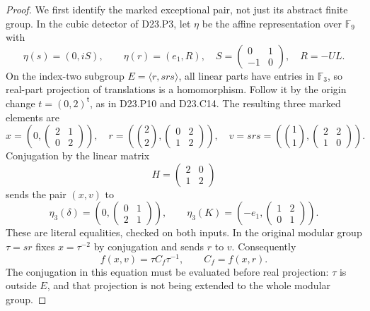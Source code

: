 \begin{proof}
We first identify the marked exceptional pair, not just its
abstract finite group.  In the cubic detector of D23.P3, let
$\eta$ be the affine representation over $\mathbb F_9$ with
\[
 \eta(s)=(0,iS),\qquad \eta(r)=(e_1,R),\quad
 S=\begin{pmatrix}0&1\\-1&0\end{pmatrix},\quad R=-UL.
\]
On the index-two subgroup $E=\langle r,srs\rangle$, all
linear parts have entries in $\mathbb F_3$, so real-part
projection of translations is a homomorphism.  Follow it
by the origin change $t=(0,2)^{\mathsf t}$, as in D23.P10
and D23.C14.  The resulting three marked elements are
\[
 x=\left(0,\begin{pmatrix}2&1\\0&2\end{pmatrix}\right),\quad
 r=\left(\binom22,\begin{pmatrix}0&2\\1&2\end{pmatrix}\right),\quad
 v=srs=\left(\binom11,\begin{pmatrix}2&2\\1&0\end{pmatrix}\right).
\]
Conjugation by the linear matrix
\[
                         H=\begin{pmatrix}2&0\\1&2\end{pmatrix}
\tag{D23.F27.3}
\]
sends the pair $(x,v)$ to
\[
 \eta_3(\delta)=\left(0,\begin{pmatrix}0&1\\2&1\end{pmatrix}\right),
 \qquad
 \eta_3(K)=\left(-e_1,\begin{pmatrix}1&2\\0&1\end{pmatrix}\right).
\tag{D23.F27.4}
\]
These are literal equalities, checked on both inputs.
In the original modular group $\tau=sr$ fixes $x=\tau^{-2}$
by conjugation and sends $r$ to $v$.  Consequently
\[
                    f(x,v)=\tau C_f\tau^{-1},\qquad C_f=f(x,r).
\tag{D23.F27.5}
\]
The conjugation in this equation must be evaluated before real
projection: $\tau$ is outside $E$, and that projection is not
being extended to the whole modular group.


\end{proof}

